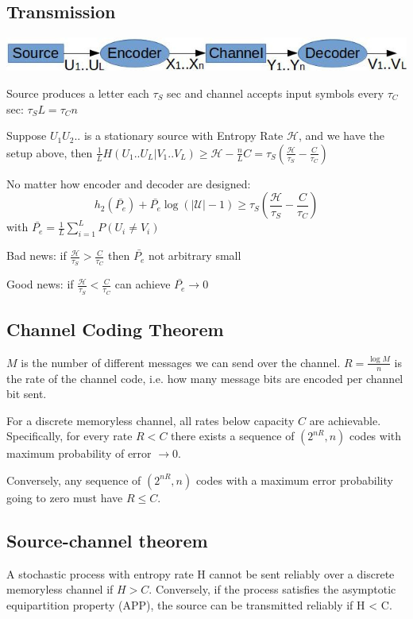 \documentclass[10pt,a4paper,landscape]{article}
\begin{document}
\begin{multicols*}{4}
\subsection{Transmission}
\begin{colfig}
	\centering
	\includegraphics[width=\linewidth]{comm-setup.png}
\end{colfig}

Source produces a letter each $\tau_S$ sec and channel accepts input symbols every $\tau_C$ sec: $\tau_S L = \tau_C n$

Suppose $U_1U_2..$ is a stationary source with Entropy Rate $\mathcal{H}$, and we have the setup above, then $\frac{1}{L} H(U_1..U_L|V_1..V_L) \geq \mathcal{H} - \frac{n}{L}C = \tau_S\left(\frac{\mathcal{H}}{\tau_S}-\frac{C}{\tau_C}\right)$

No matter how encoder and decoder are designed:
$$ h_2(\bar{P_e}) + \bar{P_e}\log(|\mathcal{U}|-1) \geq \tau_S \left(\frac{\mathcal{H}}{\tau_S}-\frac{C}{\tau_C}\right)$$ with $\bar{P_e} = \frac{1}{L} \sum_{i=1}^L P(U_i \neq V_i)$

Bad news: if $\frac{\mathcal{H}}{\tau_S} > \frac{C}{\tau_C}$ then $\bar{P_e}$ not arbitrary small

Good news: if $\frac{\mathcal{H}}{\tau_S} < \frac{C}{\tau_C}$ can achieve $\bar{P_e} \rightarrow 0$

\subsection{Channel Coding Theorem}
$M$ is the number of different messages we can send over the channel.
$R = \frac{\log M}{n}$ is the rate of the channel code, i.e. how many message bits are encoded per channel bit sent.

For a discrete memoryless channel, all rates below capacity $C$ are achievable. Specifically, for every rate $R < C$ there exists a sequence of $(2^{nR}, n)$ codes with maximum probability of error $\rightarrow 0$.

Conversely, any sequence of $(2^{nR}, n)$ codes with a maximum error probability going to zero must have $R \leq C$.

\subsection{Source-channel theorem}
A stochastic process with entropy rate H cannot be sent reliably over a discrete memoryless channel if $H > C$. Conversely, if the process satisfies the asymptotic equipartition property (APP), the source can be transmitted reliably if H < C.


\end{multicols*}
\end{document}
